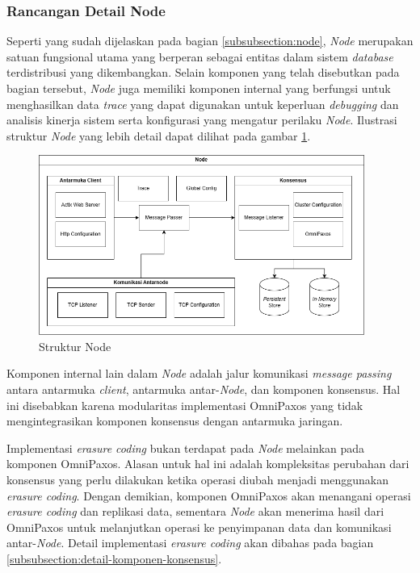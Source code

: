 \subsubsection{Rancangan Detail Node}
\label{subsubsection:detail-node}

Seperti yang sudah dijelaskan pada bagian \ref{subsubsection:node}, \textit{Node} merupakan satuan fungsional utama yang berperan sebagai entitas dalam sistem \textit{database} terdistribusi yang dikembangkan. Selain komponen yang telah disebutkan pada bagian tersebut, \textit{Node} juga memiliki komponen internal yang berfungsi untuk menghasilkan data \textit{trace} yang dapat digunakan untuk keperluan \textit{debugging} dan analisis kinerja sistem serta konfigurasi yang mengatur perilaku \textit{Node}. Ilustrasi struktur \textit{Node} yang lebih detail dapat dilihat pada gambar \ref{fig:node-structure}.

\begin{figure}[ht]
    \centering
    \includegraphics[width=0.95\textwidth]{resources/chapter-3/node-architecture.png}
    \caption{Struktur Node}
    \label{fig:node-structure}
\end{figure}

Komponen internal lain dalam \textit{Node} adalah jalur komunikasi \textit{message passing} antara antarmuka \textit{client}, antarmuka antar-\textit{Node}, dan komponen konsensus. Hal ini disebabkan karena modularitas implementasi OmniPaxos yang tidak mengintegrasikan komponen konsensus dengan antarmuka jaringan.

Implementasi \textit{erasure coding} bukan terdapat pada \textit{Node} melainkan pada komponen OmniPaxos. Alasan untuk hal ini adalah kompleksitas perubahan dari konsensus yang perlu dilakukan ketika operasi diubah menjadi menggunakan \textit{erasure coding}. Dengan demikian, komponen OmniPaxos akan menangani operasi \textit{erasure coding} dan replikasi data, sementara \textit{Node} akan menerima hasil dari OmniPaxos untuk melanjutkan operasi ke penyimpanan data dan komunikasi antar-\textit{Node}. Detail implementasi \textit{erasure coding} akan dibahas pada bagian \ref{subsubsection:detail-komponen-konsensus}.